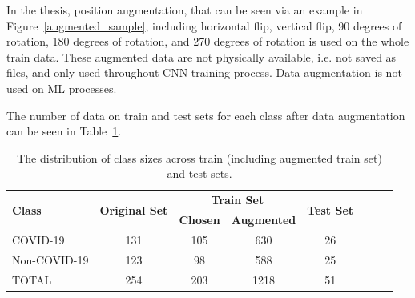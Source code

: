 In the thesis,  position augmentation, that can be seen via an example in Figure~\ref{augmented_sample}, including horizontal flip,  vertical flip,  90 degrees of rotation, 180 degrees of rotation, and 270 degrees of rotation is used on the whole train data. These augmented data are not physically available, i.e. not saved as files, and only used throughout CNN training process. Data augmentation is not used on ML processes.

The number of data on train and test sets for each class after data augmentation can be seen in Table~\ref{tab:final_dataset_size}.

\begin{table}[h]
	{
		\setlength{\tabcolsep}{14pt}
		\caption{The distribution of class sizes across train (including augmented train set) and test sets.}
		\begin{center}
			\begin{tabular}{lccrrrrr}
				\hline
				\multirow{2}{*}{\textbf{Class}} & \multirow{2}{*}{\textbf{Original Set}} & \multicolumn{2}{c}{\textbf{Train Set}} & \multirow{2}{*}{\textbf{Test Set}} \\ \cline{3-4}
				&                               & \textbf{Chosen}  & \textbf{Augmented}  &    \\
				\hline \hline
				COVID-19           & 131                           & 105     & \multicolumn{1}{c}{630} & \multicolumn{1}{c}{26} \\
				Non-COVID-19               & 123                           & 98      & \multicolumn{1}{c}{588} & \multicolumn{1}{c}{25} \\
				TOTAL                  & 254                           & 203     & \multicolumn{1}{c}{1218} & \multicolumn{1}{c}{51} \\   
				\hline
			\end{tabular}
		\end{center}
		\label{tab:final_dataset_size}
	}
\end{table}

